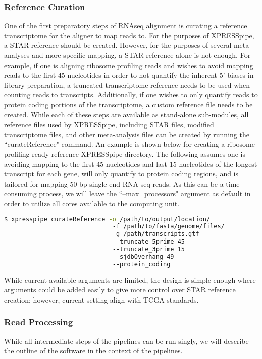 \documentclass[11pt, a4paper, oneside]{article}
\begin{document}
\subsubsection{Reference Curation}
One of the first preparatory steps of RNAseq alignment is curating a reference transcriptome for the aligner to map reads to. For the purposes of XPRESSpipe, a STAR reference should be created. However, for the purposes of several meta-analyses and more specific mapping, a STAR{} reference alone is not enough. For example, if one is aligning ribosome profiling reads and wishes to avoid mapping reads to the first 45 nucleotides in order to not quantify the inherent 5' biases in library preparation{}, a truncated transcriptome reference needs to be used when counting reads to transcripts. Additionally, if one wishes to only quantify reads to protein coding portions of the transcriptome, a custom reference file needs to be created. While each of these steps are available as stand-alone sub-modules, all reference files used by XPRESSpipe, including STAR files, modified transcriptome files, and other meta-analysis files can be created by running the ``curateReference" command. An example is shown below for creating a ribosome profiling-ready reference XPRESSpipe directory. The following assumes one is avoiding mapping to the first 45 nucleotides and last 15 nucleotides of the longest transcript for each gene, will only quantify to protein coding regions, and is tailored for mapping 50-bp single-end RNA-seq reads. As this can be a time-consuming process, we will leave the ``--max\_processors" argument as default in order to utilize all cores available to the computing unit.
\newline
\begin{lstlisting}[language=bash, caption=curateReference example]
$ xpresspipe curateReference -o /path/to/output/location/
                              -f /path/to/fasta/genome/files/
                              -g /path/transcripts.gtf
                              --truncate_5prime 45
                              --truncate_3prime 15
                              --sjdbOverhang 49
                              --protein_coding
\end{lstlisting}

While current available arguments are limited, the design is simple enough where arguments could be added easily to give more control over STAR reference creation; however, current setting align with TCGA standards.

\subsubsection{Read Processing}
While all intermediate steps of the pipelines can be run singly, we will describe the outline of the software in the context of the pipelines.
\end{document}
